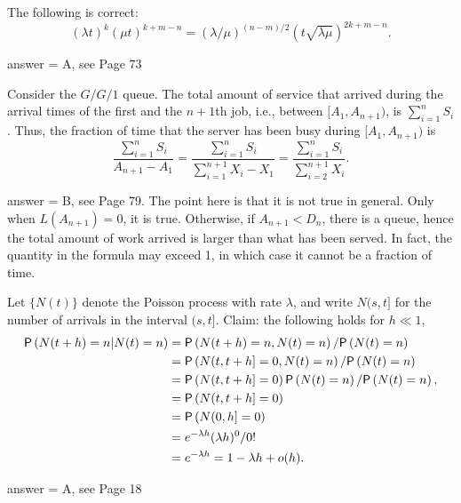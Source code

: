 \begin{exercise}[201804]
The following is correct: 
\begin{equation*}
  (\lambda t)^k (\mu t) ^{k + m - n}  
= (\lambda/\mu)^{(n-m)/2} (t\sqrt{\lambda \mu})^{2k+m-n}.
\end{equation*}
\begin{solution}
answer = A, see Page 73
\end{solution}
\end{exercise}

\begin{exercise}[201804] Consider the $G/G/1$ queue.  The total amount of service that arrived during the arrival times of the first and the $n+1$th job, i.e., between $[A_1, A_{n+1})$, is $\sum_{i=1}^n S_i$.
Thus,  the     fraction of time that the server has been busy during $[A_1, A_{n+1})$    is
        \begin{equation*}
\frac{\sum_{i=1}^n S_i}{A_{n+1}-A_1} 
=          \frac{\sum_{i=1}^n S_i}{\sum_{i=1}^{n+1}X_i -X_1} 
=          \frac{\sum_{i=1}^n S_i}{\sum_{i=2}^{n+1}X_i}.
        \end{equation*}
\begin{solution}
answer = B, see Page 79. The point here is that it is not true in general. Only when $L(A_{n+1})=0$, it is true. Otherwise, if $A_{n+1}< D_n$, there is a queue, hence the total amount of work arrived is larger than what has been served. In fact, the quantity in the formula may exceed 1, in which case it cannot be a fraction of time.
\end{solution}
\end{exercise}

\begin{exercise}[201807]{1}
Let $\{N(t)\}$ denote the Poisson process with rate $\lambda$, and write $N(s, t]$ for the number of arrivals in the interval $(s,t]$. Claim:  the following holds for $h\ll 1$, 
    \begin{align*}
  \P{N(t+h) = n | N(t) = n} 
&=  \P{N(t+h) = n, N(t) = n}/\P{N(t)=n} \\
&=  \P{N(t, t+h] = 0,  N(t) = n}/\P{N(t)=n} \\
&=  \P{N(t, t+h] = 0} \P{N(t) = n}/\P{N(t)=n}, \\
&= \P{N(t, t+h] = 0} \\
&= \P{N(0, h] = 0} \\
&= e^{-\lambda h} (\lambda h)^0/0! \\
&= e^{-\lambda h} = 1-\lambda h + o(h).
    \end{align*}
\begin{solution}
answer = A, see Page 18
\end{solution}
\end{exercise}



